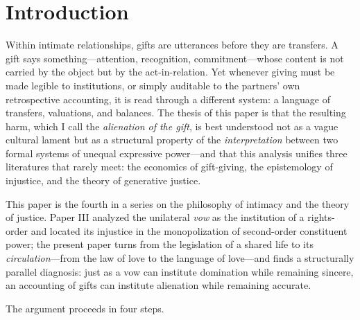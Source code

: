 \section{Introduction}
\label{p04:sec:intro}

Within intimate relationships, gifts are utterances before they are
transfers. A gift says something---attention, recognition, commitment---whose
content is not carried by the object but by the act-in-relation. Yet whenever
giving must be made legible to institutions, or simply auditable to the
partners' own retrospective accounting, it is read through a different
system: a language of transfers, valuations, and balances. The thesis of this
paper is that the resulting harm, which I call the \emph{alienation of the
gift}, is best understood not as a vague cultural lament but as a structural
property of the \emph{interpretation} between two formal systems of unequal
expressive power---and that this analysis unifies three literatures that
rarely meet: the economics of gift-giving, the epistemology of injustice, and
the theory of generative justice.

This paper is the fourth in a series on the philosophy of intimacy and the
theory of justice. Paper III \parencite{huang2026vow} analyzed the unilateral
\emph{vow} as the institution of a rights-order and located its injustice in
the monopolization of second-order constituent power; the present paper turns
from the legislation of a shared life to its \emph{circulation}---from the
law of love to the language of love---and finds a structurally parallel
diagnosis: just as a vow can institute domination while remaining sincere,
an accounting of gifts can institute alienation while remaining accurate.

The argument proceeds in four steps.

